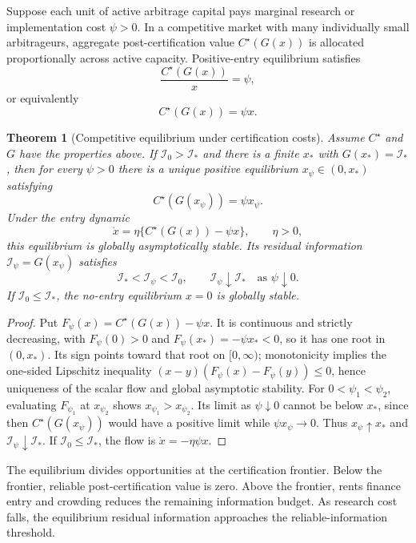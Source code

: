 \documentclass[11pt]{article}
\numberwithin{equation}{section}
\theoremstyle{plain}
\newtheorem{theorem}{Theorem}[section]
\theoremstyle{definition}
\theoremstyle{remark}
\begin{document}
Suppose each unit of active arbitrage capital pays marginal research or
implementation cost \(\psi>0\). In a competitive market with many individually small arbitrageurs,
aggregate post-certification value \(C^\star(G(x))\) is allocated proportionally
across active capacity. Positive-entry equilibrium satisfies
\[
\frac{C^\star(G(x))}{x}=\psi,
\]
or equivalently
\[
C^\star(G(x))=\psi x.
\]

\begin{theorem}[Competitive equilibrium under certification costs]\label{thm:competitive-equilibrium}
Assume \(C^\star\) and \(G\) have the properties above. If \(\mathcal I_0>\mathcal I_*\)
and there is a finite \(x_*\) with \(G(x_*)=\mathcal I_*\), then for every
\(\psi>0\) there is a unique positive equilibrium \(x_\psi\in(0,x_*)\)
satisfying
\[
C^\star(G(x_\psi))=\psi x_\psi.
\]
Under the entry dynamic
\[
\dot x=\eta\{C^\star(G(x))-\psi x\},\qquad \eta>0,
\]
this equilibrium is globally asymptotically stable. Its residual
information \(\mathcal I_\psi=G(x_\psi)\) satisfies
\[
\mathcal I_*<\mathcal I_\psi<\mathcal I_0,
\qquad
\mathcal I_\psi\downarrow \mathcal I_*\quad\text{as }\psi\downarrow0.
\]
If \(\mathcal I_0\le \mathcal I_*\), the no-entry equilibrium \(x=0\) is globally stable.
\end{theorem}

\begin{proof}
Put $F_\psi(x)=C^\star(G(x))-\psi x$. It is continuous and strictly decreasing, with $F_\psi(0)>0$ and $F_\psi(x_*)=-\psi x_*<0$, so it has one root in $(0,x_*)$. Its sign points toward that root on $[0,\infty)$; monotonicity implies the one-sided Lipschitz inequality $(x-y)(F_\psi(x)-F_\psi(y))\le0$, hence uniqueness of the scalar flow and global asymptotic stability. For $0<\psi_1<\psi_2$, evaluating $F_{\psi_1}$ at $x_{\psi_2}$ shows $x_{\psi_1}>x_{\psi_2}$. Its limit as $\psi\downarrow0$ cannot be below $x_*$, since then $C^\star(G(x_\psi))$ would have a positive limit while $\psi x_\psi\to0$. Thus $x_\psi\uparrow x_*$ and $\mathcal I_\psi\downarrow\mathcal I_*$. If $\mathcal I_0\le\mathcal I_*$, the flow is $\dot x=-\eta\psi x$.
\end{proof}

The equilibrium divides opportunities at the certification frontier. Below the frontier, reliable post-certification value is zero. Above the frontier, rents finance entry and crowding reduces the remaining information budget. As research cost falls, the equilibrium residual information approaches the reliable-information threshold.
\end{document}
